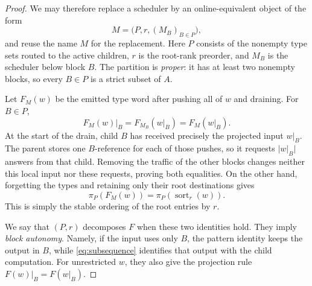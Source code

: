 \documentclass[11pt]{article}
\theoremstyle{definition}
\newcommand{\sort}{\operatorname{sort}}
\begin{document}
\begin{proof}
We may therefore replace a scheduler by an online-equivalent object of the
form
\begin{equation}
  M=\bigl(P,r,(M_B)_{B\in P}\bigr),
  \tag{4}\label{eq:normal-form}
\end{equation}
and reuse the name \(M\) for the replacement.  Here \(P\) consists of the
nonempty type sets routed to the active children, \(r\) is the root-rank
preorder, and \(M_B\) is the scheduler below block \(B\).  The partition is
\emph{proper}: it has at least two nonempty blocks, so every \(B\in P\) is
a strict subset of \(A\).

Let \(F_M(w)\) be the emitted type word after pushing all of \(w\) and
draining.  For \(B\in P\),
\begin{equation}
  F_M(w)|_B
  =
  F_{M_B}(w|_B)
  =
  F_M(w|_B).
  \tag{5}\label{eq:subsequence}
\end{equation}
At the start of the drain, child \(B\) has received precisely the projected
input \(w|_B\).  The parent stores one \(B\)-reference for each of those
pushes, so it requests \(\lvert w|_B\rvert\) answers from that child.
Removing the traffic of the other blocks changes neither this local input
nor these requests, proving both equalities.  On the other hand, forgetting
the types and retaining only their root destinations gives
\begin{equation}
  \pi_P(F_M(w))
  =
  \pi_P(\sort_r(w)).
  \tag{6}\label{eq:pattern}
\end{equation}
This is simply the stable ordering of the root entries by \(r\).

We say that \((P,r)\) decomposes \(F\) when these two identities hold.
They imply \emph{block autonomy}.  Namely, if the input uses only \(B\),
the pattern identity keeps the output in \(B\), while
\eqref{eq:subsequence} identifies that output with the child computation.
For unrestricted \(w\), they also give the projection rule
\(F(w)|_B=F(w|_B)\).


\end{proof}
\end{document}

